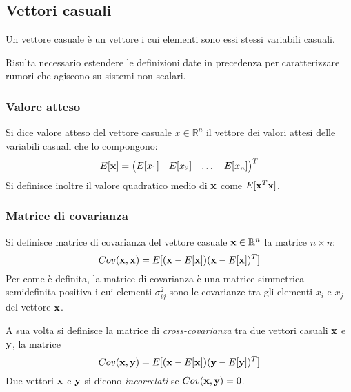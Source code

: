 \newpage
\subsection{Vettori casuali}

Un vettore casuale è un vettore i cui elementi sono essi stessi variabili casuali.

Risulta necessario estendere le definizioni date in precedenza per caratterizzare rumori che agiscono su sistemi non scalari.

\subsubsection{Valore atteso}

Si dice valore atteso del vettore casuale $x \in \mathbb{R}^n$ il vettore dei valori attesi delle variabili casuali che lo compongono: \[E[\mathbf{x}] = \begin{pmatrix}
E[x_1] & E[x_2] & \dots & E[x_n]
\end{pmatrix}^T
\]
Si definisce inoltre il valore quadratico medio di $\mathbf{x}$ come $E[\mathbf{x}^T \mathbf{x}]$.

\subsubsection{Matrice di covarianza}

Si definisce matrice di covarianza del vettore casuale $\mathbf{x} \in \mathbb{R}^n$ la matrice $n \times n$: \[ Cov(\mathbf{x}, \mathbf{x}) = E[(\mathbf{x}-E[\mathbf{x}])(\mathbf{x}-E[\mathbf{x}])^T]\]
Per come è definita, la matrice di covarianza è una matrice simmetrica semidefinita positiva i cui elementi $\sigma^2_{ij}$ sono le covarianze tra gli elementi $x_i$ e $x_j$ del vettore $\mathbf{x}$.

A sua volta si definisce la matrice di \textit{cross-covarianza} tra due vettori casuali $\mathbf{x}$ e $\mathbf{y}$, la matrice \[ Cov(\mathbf{x}, \mathbf{y}) = E[(\mathbf{x}-E[\mathbf{x}])(\mathbf{y}-E[\mathbf{y}])^T]\]
Due vettori $\mathbf{x}$ e $\mathbf{y}$ si dicono \textit{incorrelati} se $Cov(\mathbf{x},\mathbf{y}) = 0$.